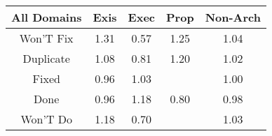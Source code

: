 \begin{tabular}{|c||c|c|c|c|}
\hline
All Domains & Exis & Exec & Prop & Non-Arch \\ 
\hline
Won'T Fix & \cellcolor[rgb]{0.53,0.66,0.42} 1.31 & \cellcolor[rgb]{0.76,0.13,0.28} 0.57 & \cellcolor[rgb]{0.6031982879364206,0.6946728732330414,0.42} 1.25 & \cellcolor[rgb]{0.8668974297723929,0.8195829930500809,0.42} 1.04 \\ 
\hline
Duplicate & \cellcolor[rgb]{0.8153318685304297,0.7951572008828351,0.42} 1.08 & \cellcolor[rgb]{0.8415170716364482,0.515847472412521,0.3560826001940183} 0.81 & \cellcolor[rgb]{0.6658018126352507,0.7243271744061714,0.42} 1.20 & \cellcolor[rgb]{0.8871687238410215,0.829185184977326,0.42} 1.02 \\ 
\hline
Fixed & \cellcolor[rgb]{0.8942050703479092,0.7652373329801033,0.4052580656580485} 0.96 & \cellcolor[rgb]{0.8676871107080237,0.8199570524406428,0.42} 1.03 &  & \cellcolor[rgb]{0.9092381524814862,0.8363939217457013,0.4192889423160538} 1.00 \\ 
\hline
Done & \cellcolor[rgb]{0.8973284234771407,0.780021204458466,0.40817319524533135} 0.96 & \cellcolor[rgb]{0.6965599865778591,0.7388968357474068,0.42} 1.18 & \cellcolor[rgb]{0.8397223985805746,0.5073526866147194,0.35440757200853623} 0.80 & \cellcolor[rgb]{0.9033324546348844,0.8084402852717865,0.4137769576592255} 0.98 \\ 
\hline
Won'T Do & \cellcolor[rgb]{0.6891698271079523,0.7353962338932405,0.42} 1.18 & \cellcolor[rgb]{0.8058595019751958,0.3470683093492601,0.32280220184351605} 0.70 &  & \cellcolor[rgb]{0.8717930035270035,0.8219019490391068,0.42} 1.03 \\ 
\hline
\end{tabular}